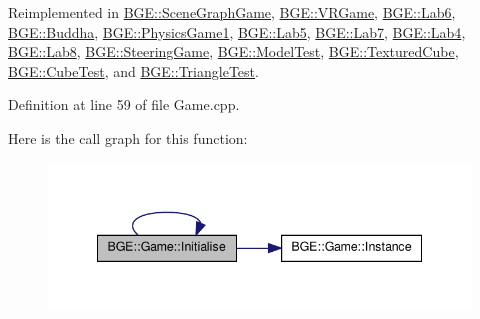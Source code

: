 Reimplemented in \hyperlink{class_b_g_e_1_1_scene_graph_game_ae129b54e7ca57dcc6a8b821c569bebd7}{B\-G\-E\-::\-Scene\-Graph\-Game}, \hyperlink{class_b_g_e_1_1_v_r_game_a577e86f3ba2b3b259d1fe1ba07036926}{B\-G\-E\-::\-V\-R\-Game}, \hyperlink{class_b_g_e_1_1_lab6_a4c6c1fca3a0fce3be6be36896c84b1c8}{B\-G\-E\-::\-Lab6}, \hyperlink{class_b_g_e_1_1_buddha_a0b06f27687b1d94374bccec0de47c45c}{B\-G\-E\-::\-Buddha}, \hyperlink{class_b_g_e_1_1_physics_game1_a005afe565f5c60cd980493627b947802}{B\-G\-E\-::\-Physics\-Game1}, \hyperlink{class_b_g_e_1_1_lab5_a22e9d710c6270571a8f4aa9da3a2f59b}{B\-G\-E\-::\-Lab5}, \hyperlink{class_b_g_e_1_1_lab7_ac7d2597bb842edcf70174b436c8811fd}{B\-G\-E\-::\-Lab7}, \hyperlink{class_b_g_e_1_1_lab4_a3873eb644cbdeb20ab0f033e4e43e9a3}{B\-G\-E\-::\-Lab4}, \hyperlink{class_b_g_e_1_1_lab8_aec401d2069e9e5d6a6d3d71367a68ba8}{B\-G\-E\-::\-Lab8}, \hyperlink{class_b_g_e_1_1_steering_game_ae0536228be79c785e43bc7c4d841c5bc}{B\-G\-E\-::\-Steering\-Game}, \hyperlink{class_b_g_e_1_1_model_test_a0569efdab1ec10bab4299987b1563c14}{B\-G\-E\-::\-Model\-Test}, \hyperlink{class_b_g_e_1_1_textured_cube_a5f29f2fede1faaf76416adcb6591ed0c}{B\-G\-E\-::\-Textured\-Cube}, \hyperlink{class_b_g_e_1_1_cube_test_af286e7a88db522c6e4a4bfdd3a38990f}{B\-G\-E\-::\-Cube\-Test}, and \hyperlink{class_b_g_e_1_1_triangle_test_ab661d39ab6d4dbaf22c358d60a3a821c}{B\-G\-E\-::\-Triangle\-Test}.



Definition at line 59 of file Game.\-cpp.



Here is the call graph for this function\-:
\nopagebreak
\begin{figure}[H]
\begin{center}
\leavevmode
\includegraphics[width=342pt]{class_b_g_e_1_1_game_a2973b50f49c7906ec0e642a8753fd995_cgraph}
\end{center}
\end{figure}




